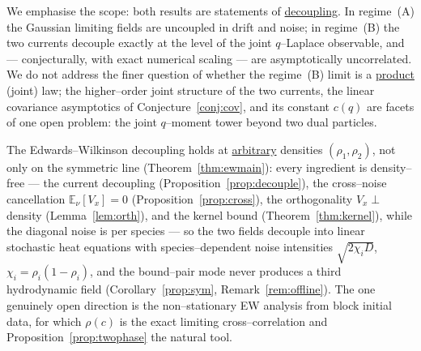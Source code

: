 \documentclass[11pt]{article}
\theoremstyle{plain}
\theoremstyle{definition}
\theoremstyle{remark}
\newcommand{\E}{\mathbb{E}}\newcommand{\PP}{\mathbb{P}}\newcommand{\dd}{\,\mathrm{d}}
\begin{document}
We emphasise the scope: both results are statements of \underline{decoupling}. In regime~(A)
the Gaussian limiting fields are uncoupled in drift and noise; in regime~(B) the two
currents decouple exactly at the level of the joint $q$--Laplace observable, and ---
conjecturally, with exact numerical scaling --- are asymptotically uncorrelated. We
do not address the finer question of whether the regime~(B) limit is a \underline{product}
(joint) law; the higher--order joint structure of the two currents, the linear
covariance asymptotics of Conjecture~\ref{conj:cov}, and its constant $c(q)$ are
facets of one open problem: the joint $q$--moment tower beyond two dual particles.

The Edwards--Wilkinson decoupling holds at \underline{arbitrary} densities $(\rho_1,\rho_2)$,
not only on the symmetric line (Theorem~\ref{thm:ewmain}): every ingredient is
density--free --- the current decoupling (Proposition~\ref{prop:decouple}), the
cross--noise cancellation $\E_\nu[V_x]=0$ (Proposition~\ref{prop:cross}), the
orthogonality $V_x\perp$ density (Lemma~\ref{lem:orth}), and the kernel bound
(Theorem~\ref{thm:kernel}), while the diagonal noise is per species --- so the two
fields decouple into linear stochastic heat equations with species--dependent noise
intensities $\sqrt{2\chi_iD}$, $\chi_i=\rho_i(1-\rho_i)$, and the bound--pair mode never
produces a third hydrodynamic field (Corollary~\ref{prop:sym}, Remark~\ref{rem:offline}).
The one genuinely open direction is the non--stationary EW analysis from block initial
data, for which $\rho(c)$ is the exact limiting cross--correlation and
Proposition~\ref{prop:twophase} the natural tool.
\end{document}
